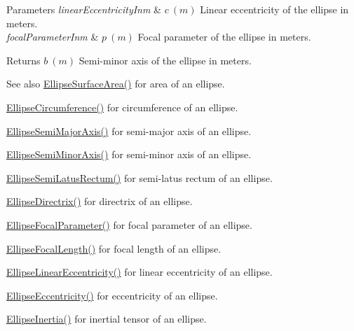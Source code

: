 \begin{DoxyParams}{Parameters}
{\em linear\+Eccentricity\+Inm} & $ c\ (m)$ Linear eccentricity of the ellipse in meters. \\
\hline
{\em focal\+Parameter\+Inm} & $ p\ (m)$ Focal parameter of the ellipse in meters. \\
\hline
\end{DoxyParams}
\begin{DoxyReturn}{Returns}
$ b\ (m)$ Semi-\/minor axis of the ellipse in meters. 
\end{DoxyReturn}
\begin{DoxySeeAlso}{See also}
\mbox{\hyperlink{group___e_g_x_math-_geometry-2_d-_ellipse-_surface_area_ga4ce8c8323e9718ce5458f4ab7f6d823d}{Ellipse\+Surface\+Area()}} for area of an ellipse. 

\mbox{\hyperlink{group___e_g_x_math-_geometry-2_d-_ellipse-_circumference_ga4172802ac674eb53467b44928ac635c7}{Ellipse\+Circumference()}} for circumference of an ellipse. 

\mbox{\hyperlink{group___e_g_x_math-_geometry-2_d-_ellipse-_semi_major_axis_ga646a2ca065f4ac3f666a9ea22f3bb527}{Ellipse\+Semi\+Major\+Axis()}} for semi-\/major axis of an ellipse. 

\mbox{\hyperlink{group___e_g_x_math-_geometry-2_d-_ellipse-_semi_minor_axis_gae461acf3333565d69527dd86e9aa2b32}{Ellipse\+Semi\+Minor\+Axis()}} for semi-\/minor axis of an ellipse. 

\mbox{\hyperlink{group___e_g_x_math-_geometry-2_d-_ellipse-_semi_latus_rectum_gacfd1844eb4ef3d1ee3c0b460a6442ae6}{Ellipse\+Semi\+Latus\+Rectum()}} for semi-\/latus rectum of an ellipse. 

\mbox{\hyperlink{group___e_g_x_math-_geometry-2_d-_ellipse-_directrix_gace8f72a8efbc9c18d3eb689151405106}{Ellipse\+Directrix()}} for directrix of an ellipse. 

\mbox{\hyperlink{group___e_g_x_math-_geometry-2_d-_ellipse-_focal_parameter_ga4cd01a38c72c092ef9791351948bf69b}{Ellipse\+Focal\+Parameter()}} for focal parameter of an ellipse. 

\mbox{\hyperlink{group___e_g_x_math-_geometry-2_d-_ellipse-_focal_length_gab8d63de7640c880cfecaeada6f2afdac}{Ellipse\+Focal\+Length()}} for focal length of an ellipse. 

\mbox{\hyperlink{group___e_g_x_math-_geometry-2_d-_ellipse-_linear_eccentricity_gac70b3010e30aa8b73deb50fe2b9b9a91}{Ellipse\+Linear\+Eccentricity()}} for linear eccentricity of an ellipse. 

\mbox{\hyperlink{group___e_g_x_math-_geometry-2_d-_ellipse-_eccentricity_ga6a0a7fba17f782616894cfc447628c33}{Ellipse\+Eccentricity()}} for eccentricity of an ellipse. 

\mbox{\hyperlink{group___e_g_x_math-_geometry-2_d-_ellipse-_inertia_ga10a3049c2f04b50f271fb01dc62e4cf8}{Ellipse\+Inertia()}} for inertial tensor of an ellipse. 
\end{DoxySeeAlso}
